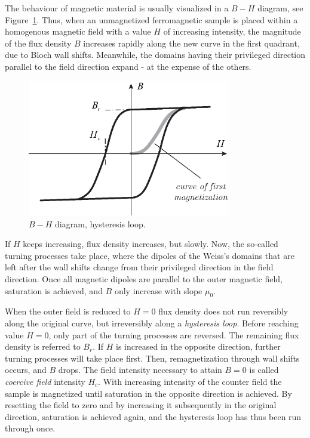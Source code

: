 \documentclass[11pt,a4paper,oneside]{book}
\numberwithin{equation}{section}
\theoremstyle{it}
\theoremstyle{definition}
\begin{document}
The behaviour of magnetic material is usually visualized in a $B-H$ diagram, see Figure~\ref{BH_diagram_1}. Thus, when an unmagnetized ferromagnetic sample is placed within a homogenous magnetic field with a value $H$ of increasing intensity, the magnitude of the flux density $B$ increases rapidly along the new curve in the first quadrant, due to Bloch wall shifts. Meanwhile, the domains having their privileged  direction parallel to the field direction expand - at the expense of the others.
\begin{figure}[H]
	\centering
	\includegraphics[width = 250pt, angle = 0, 
	keepaspectratio]{figures/magnetic_bearing/BH_diagram_1.eps}
	\captionsetup{width=0.5\textwidth, font=small}	
	\caption{$B-H$ diagram, hysteresis loop.}
	\label{BH_diagram_1}
\end{figure}
If $H$ keeps increasing, flux density increases, but slowly. Now, the so-called turning processes take place, where the dipoles of the Weiss's domains that are left after the wall shifts change from their privileged direction in the field direction. Once all magnetic dipoles are parallel to the outer magnetic field, saturation is achieved, and $B$ only increase with slope $\mu_0$.

When the outer field is reduced to $H=0$ flux density does not run reversibly along the original curve, but irreversibly along a \textit{hysteresis loop}. Before reaching value $H=0$, only part of the turning processes are reversed. The remaining flux density is referred to $B_r$. If $H$ is increased in the opposite direction, further turning processes will take place first. Then, remagnetization through wall shifts occurs, and $B$ drops. The field intensity necessary to attain $B=0$ is called \textit{coercive field} intensity $H_c$. With increasing intensity of the counter field the sample is magnetized until saturation in the opposite direction is achieved. By resetting the field to zero and by increasing it subsequently in the original direction, saturation is achieved again, and the hysteresis loop has thus been run through once.  
\end{document}
